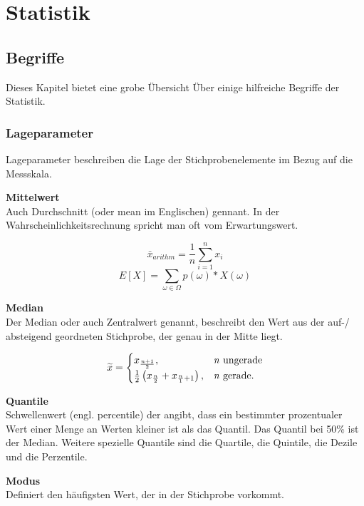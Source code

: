 \newpage
\section{Statistik}
\label{sec:stat}

\subsection{Begriffe}
\begin{flushleft}
Dieses Kapitel bietet eine grobe Übersicht Über einige hilfreiche Begriffe der Statistik.

\subsubsection{Lageparameter}
Lageparameter beschreiben die Lage der Stichprobenelemente im Bezug auf die Messskala.
\linebreak

\textbf{Mittelwert} \\
Auch Durchschnitt (oder mean im Englischen) gennant. In der Wahrscheinlichkeitsrechnung spricht man oft vom Erwartungswert.

$$\bar{x}_{arithm} = \frac{1}{n} \sum_{i=1}^{n} x_i$$
$$E[X] = \sum_{\omega \in \Omega} p(\omega)*X(\omega)$$

\textbf{Median} \\ 
Der Median oder auch Zentralwert genannt, beschreibt den Wert aus der auf-/ absteigend geordneten Stichprobe, der genau in der Mitte liegt.

\begin{equation*}
  \widetilde{x} = \begin{cases}
    x_{\frac{n+1}{2}}, & \text{\textit{n} ungerade}\\
    \frac{1}{2} \left( x_{\frac{n}{2}} + x_{\frac{n}{1}+1} \right), & \text{\textit{n} gerade}.
  \end{cases}
\end{equation*}


\textbf{Quantile} \\
Schwellenwert (engl. percentile) der angibt, dass ein bestimmter prozentualer Wert einer Menge an Werten kleiner ist als das Quantil. 
Das Quantil bei 50\% ist der Median. Weitere spezielle Quantile sind die Quartile, die Quintile, die Dezile und die Perzentile.
\linebreak

\textbf{Modus} \\
Definiert den häufigsten Wert, der in der Stichprobe vorkommt.
\linebreak


\end{flushleft}
